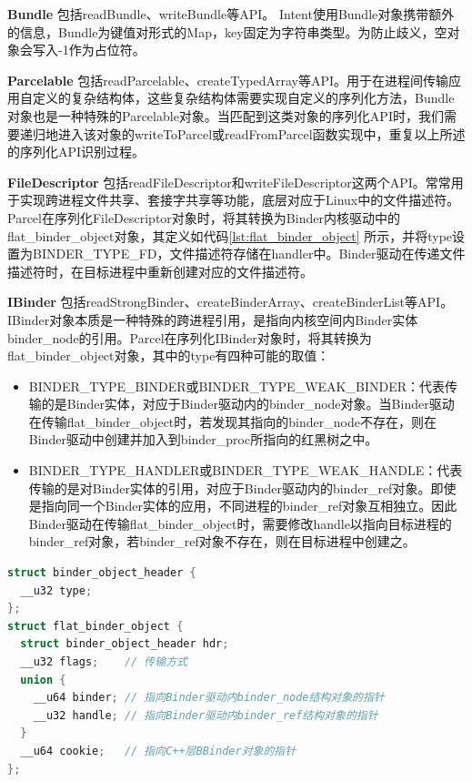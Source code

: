 \documentclass[winfonts,master,twoside]{njuthesis}
\begin{document}
\textbf{Bundle} \quad 包括readBundle、writeBundle等API。 Intent使用Bundle对象携带额外的信息，Bundle为键值对形式的Map，key固定为字符串类型。为防止歧义，空对象会写入-1作为占位符。

\textbf{Parcelable} \quad 包括readParcelable、createTypedArray等API。用于在进程间传输应用自定义的复杂结构体，这些复杂结构体需要实现自定义的序列化方法，Bundle对象也是一种特殊的Parcelable对象。当匹配到这类对象的序列化API时，我们需要递归地进入该对象的writeToParcel或readFromParcel函数实现中，重复以上所述的序列化API识别过程。

\textbf{FileDescriptor} \quad 包括readFileDescriptor和writeFileDescriptor这两个API。常常用于实现跨进程文件共享、套接字共享等功能，底层对应于Linux中的文件描述符。Parcel在序列化FileDescriptor对象时，将其转换为Binder内核驱动中的flat\_binder\_object对象，其定义如代码\ref{lst:flat_binder_object} 所示，并将type设置为BINDER\_TYPE\_FD，文件描述符存储在handler中。Binder驱动在传递文件描述符时，在目标进程中重新创建对应的文件描述符。

\textbf{IBinder} \quad 包括readStrongBinder、createBinderArray、createBinderList等API。IBinder对象本质是一种特殊的跨进程引用，是指向内核空间内Binder实体binder\_node的引用。Parcel在序列化IBinder对象时，将其转换为flat\_binder\_object对象，其中的type有四种可能的取值：
\begin{itemize}
	\item BINDER\_TYPE\_BINDER或BINDER\_TYPE\_WEAK\_BINDER：代表传输的是Binder实体，对应于Binder驱动内的binder\_node对象。当Binder驱动在传输flat\_binder\_object时，若发现其指向的binder\_node不存在，则在Binder驱动中创建并加入到binder\_proc所指向的红黑树之中。
	\item BINDER\_TYPE\_HANDLER或BINDER\_TYPE\_WEAK\_HANDLE：代表传输的是对Binder实体的引用，对应于Binder驱动内的binder\_ref对象。即使是指向同一个Binder实体的应用，不同进程的binder\_ref对象互相独立。因此Binder驱动在传输flat\_binder\_object时，需要修改handle以指向目标进程的binder\_ref对象，若binder\_ref对象不存在，则在目标进程中创建之。
\end{itemize}


\begin{lstlisting}[caption={flat\_binder\_object结构体定义},label={lst:flat_binder_object},language=C] 
struct binder_object_header {
  __u32 type;
};
struct flat_binder_object {
  struct binder_object_header hdr;
  __u32 flags;    // 传输方式
  union {
    __u64 binder; // 指向Binder驱动内binder_node结构对象的指针
    __u32 handle; // 指向Binder驱动内binder_ref结构对象的指针
  }
  __u64 cookie;   // 指向C++层BBinder对象的指针
};
\end{lstlisting}
\end{document}
